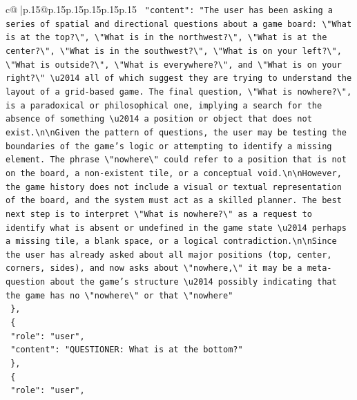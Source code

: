 \documentclass{article}
\begin{document}
{\begin{supertabular}{c@{$\;$}|p{.15\linewidth}@{}p{.15\linewidth}p{.15\linewidth}p{.15\linewidth}p{.15\linewidth}p{.15\linewidth}}
{{{\texttt{    "content": "The user has been asking a series of spatial and directional questions about a game board: \textbackslash{}"What is at the top?\textbackslash{}", \textbackslash{}"What is in the northwest?\textbackslash{}", \textbackslash{}"What is at the center?\textbackslash{}", \textbackslash{}"What is in the southwest?\textbackslash{}", \textbackslash{}"What is on your left?\textbackslash{}", \textbackslash{}"What is outside?\textbackslash{}", \textbackslash{}"What is everywhere?\textbackslash{}", and \textbackslash{}"What is on your right?\textbackslash{}" \textbackslash{}u2014 all of which suggest they are trying to understand the layout of a grid{-}based game. The final question, \textbackslash{}"What is nowhere?\textbackslash{}", is a paradoxical or philosophical one, implying a search for the absence of something \textbackslash{}u2014 a position or object that does not exist.\textbackslash{}n\textbackslash{}nGiven the pattern of questions, the user may be testing the boundaries of the game's logic or attempting to identify a missing element. The phrase \textbackslash{}"nowhere\textbackslash{}" could refer to a position that is not on the board, a non{-}existent tile, or a conceptual void.\textbackslash{}n\textbackslash{}nHowever, the game history does not include a visual or textual representation of the board, and the system must act as a skilled planner. The best next step is to interpret \textbackslash{}"What is nowhere?\textbackslash{}" as a request to identify what is absent or undefined in the game state \textbackslash{}u2014 perhaps a missing tile, a blank space, or a logical contradiction.\textbackslash{}n\textbackslash{}nSince the user has already asked about all major positions (top, center, corners, sides), and now asks about \textbackslash{}"nowhere,\textbackslash{}" it may be a meta{-}question about the game's structure \textbackslash{}u2014 possibly indicating that the game has no \textbackslash{}"nowhere\textbackslash{}" or that \textbackslash{}"nowhere"} \\
\texttt{  \},} \\
\texttt{  \{} \\
\texttt{    "role": "user",} \\
\texttt{    "content": "QUESTIONER: What is at the bottom?"} \\
\texttt{  \},} \\
\texttt{  \{} \\
\texttt{    "role": "user",} \\
}}}
\end{supertabular}}
\end{document}
